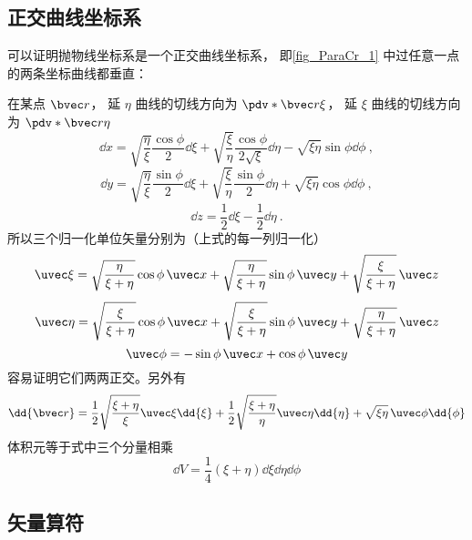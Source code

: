 
\subsection{正交曲线坐标系}
可以证明抛物线坐标系是一个正交曲线坐标系， 即\autoref{fig_ParaCr_1} 中过任意一点的两条坐标曲线都垂直：

在某点 $\bvec r$， 延 $\eta$ 曲线的切线方向为 $\pdv*{\bvec r}{\xi}$， 延 $\xi$ 曲线的切线方向为 $\pdv*{\bvec r}{\eta}$
\begin{equation}
\dd{x} = \sqrt{\frac{\eta}{\xi}}\frac{\cos\phi}{2}\dd{\xi} + \sqrt{\frac{\xi}{\eta}}\frac{\cos\phi}{2\sqrt{\xi}}\dd{\eta} - \sqrt{\xi\eta}\sin\phi\dd{\phi}~,
\end{equation}
\begin{equation}
\dd{y} = \sqrt{\frac{\eta}{\xi}}\frac{\sin\phi}{2}\dd{\xi} + \sqrt{\frac{\xi}{\eta}}\frac{\sin\phi}{2}\dd{\eta} + \sqrt{\xi\eta}\cos\phi\dd{\phi}~,
\end{equation}
\begin{equation}
\dd{z} = \frac{1}{2}\dd{\xi} - \frac{1}{2}\dd{\eta}~.
\end{equation}
所以三个归一化单位矢量分别为（上式的每一列归一化）
\begin{equation}
\uvec \xi = \sqrt{\frac{\eta}{\xi+\eta}}\cos\phi\,\uvec x + \sqrt{\frac{\eta}{\xi+\eta}}\sin\phi\,\uvec y + \sqrt{\frac{\xi}{\xi+\eta}}\,\uvec z
\end{equation}
\begin{equation}
\uvec \eta = \sqrt{\frac{\xi}{\xi+\eta}}\cos\phi\,\uvec x + \sqrt{\frac{\xi}{\xi+\eta}}\sin\phi\,\uvec y + \sqrt{\frac{\eta}{\xi+\eta}}\,\uvec z
\end{equation}
\begin{equation}
\uvec \phi = -\sin\phi \,\uvec x + \cos\phi \,\uvec y
\end{equation}
容易证明它们两两正交。另外有
\begin{equation}\label{eq_ParaCr_4}
\dd{\bvec r} = \frac{1}{2}\sqrt{\frac{\xi + \eta}{\xi}} \uvec \xi \dd{\xi}
+ \frac{1}{2}\sqrt{\frac{\xi + \eta}{\eta}} \uvec \eta \dd{\eta}
+ \sqrt{\xi\eta}\, \uvec \phi \dd{\phi}
\end{equation}
体积元等于式中三个分量相乘
\begin{equation}
\dd{V} = \frac{1}{4} (\xi + \eta) \dd{\xi}\dd{\eta}\dd{\phi}
\end{equation}

\subsection{矢量算符}

